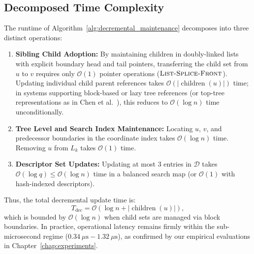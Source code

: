 \subsection{Decomposed Time Complexity}
The runtime of Algorithm~\ref{alg:decremental_maintenance} decomposes into three distinct operations:
\begin{enumerate}
    \item \textbf{Sibling Child Adoption:} By maintaining children in doubly-linked lists with explicit boundary head and tail pointers, transferring the child set from $u$ to $v$ requires only $\mathcal{O}(1)$ pointer operations ($\textsc{List-Splice-Front}$). Updating individual child parent references takes $\mathcal{O}(|\operatorname{children}(u)|)$ time; in systems supporting block-based or lazy tree references (or top-tree representations as in Chen et al.~\cite{chen2024distance}), this reduces to $\mathcal{O}(\log n)$ time unconditionally.
    \item \textbf{Tree Level and Search Index Maintenance:} Locating $u$, $v$, and predecessor boundaries in the coordinate index takes $\mathcal{O}(\log n)$ time. Removing $u$ from $L_k$ takes $\mathcal{O}(1)$ time.
    \item \textbf{Descriptor Set Updates:} Updating at most 3 entries in $\mathcal{D}$ takes $\mathcal{O}(\log q) \le \mathcal{O}(\log n)$ time in a balanced search map (or $\mathcal{O}(1)$ with hash-indexed descriptors).
\end{enumerate}
Thus, the total decremental update time is:
\begin{equation}
    T_{\text{dec}} = \mathcal{O}(\log n + |\operatorname{children}(u)|),
\end{equation}
which is bounded by $\mathcal{O}(\log n)$ when child sets are managed via block boundaries. In practice, operational latency remains firmly within the sub-microsecond regime ($0.34\ \mu\text{s} - 1.32\ \mu\text{s}$), as confirmed by our empirical evaluations in Chapter~\ref{chap:experiments}.
